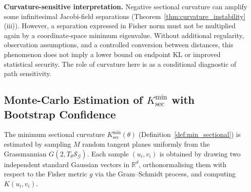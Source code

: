 \documentclass[a4paper,fleqn]{cas-dc}
\newcommand{\R}{\mathbb{R}}
\newcommand{\calS}{\mathcal{S}}
\newcommand{\calG}{\mathcal{G}}
\begin{document}
\noindent\textbf{Curvature-sensitive interpretation.}
Negative sectional curvature can amplify some infinitesimal
Jacobi-field separations (Theorem~\ref{thm:curvature_instability}(iii)).
However, a separation expressed in Fisher norm must not be multiplied
again by a coordinate-space minimum eigenvalue. Without additional
regularity, observation assumptions, and a controlled conversion
between distances, this phenomenon does not imply a lower bound on
endpoint KL or improved statistical security. The role of curvature
here is as a conditional diagnostic of path sensitivity.

\subsection{Monte-Carlo Estimation of \texorpdfstring{$K_{\sec}^{\min}$}{Minimum Sectional Curvature} with Bootstrap Confidence}
\label{subsec:kmin_bootstrap}

The minimum sectional curvature $K_{\sec}^{\min}(\theta)$
(Definition~\ref{def:min_sectional}) is estimated by sampling $M$ random
tangent planes uniformly from the Grassmannian $G(2, T_\theta\calS_{\calG})$.
Each sample $(u_i, v_i)$ is obtained by drawing two independent standard
Gaussian vectors in $\R^d$, orthonormalising them with respect to the Fisher
metric $g$ via the Gram--Schmidt process, and computing $K(u_i, v_i)$.
\end{document}
